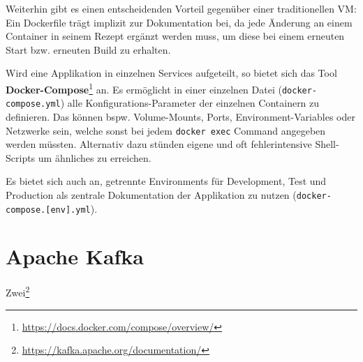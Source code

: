 \par
Weiterhin gibt es einen entscheidenden Vorteil gegenüber einer traditionellen \ac{VM}: Ein Dockerfile trägt implizit zur Dokumentation bei, da jede Änderung an einem Container in seinem Rezept ergänzt werden muss, um diese bei einem erneuten Start \ac{bzw.} erneuten Build zu erhalten.
\par
Wird eine Applikation in einzelnen Services aufgeteilt, so bietet sich das Tool \textbf{Docker-Compose}\footnote{\url{https://docs.docker.com/compose/overview/}} an.
Es ermöglicht in einer einzelnen Datei (\texttt{docker-\break compose.yml}) alle Konfigurations-Parameter der einzelnen Containern zu definieren.
Das können \ac{bspw.} Volume-Mounts, Ports, Environment-Variables oder Netzwerke sein, welche sonst bei jedem \texttt{docker exec} Command angegeben werden müssten.
Alternativ dazu stünden eigene und oft fehlerintensive Shell-Scripts um ähnliches zu erreichen. 
\par
Es bietet sich auch an, getrennte Environments für Development, Test und Production als zentrale Dokumentation der Applikation zu nutzen (\texttt{docker-\break compose.[env].yml}).

\section{Apache Kafka}
Zwei\footnote{\url{https://kafka.apache.org/documentation/}}
\par
\blindtext
\par
\blindtext


